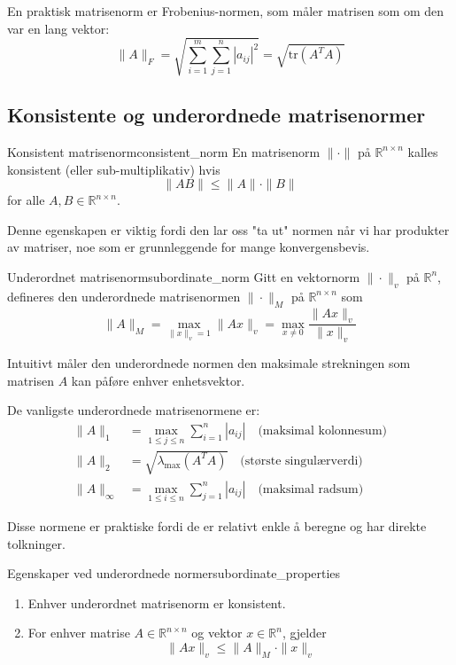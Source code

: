 En praktisk matrisenorm er Frobenius-normen, som måler matrisen som om den var en lang vektor:
\[
	\|A\|_F = \sqrt{\sum_{i=1}^m \sum_{j=1}^n |a_{ij}|^2} = \sqrt{\text{tr}(A^T A)}
\]

\subsection{Konsistente og underordnede matrisenormer}

\begin{definition}{Konsistent matrisenorm}{consistent_norm}
	En matrisenorm $\|\cdot\|$ på $\mathbb{R}^{n \times n}$ kalles konsistent (eller sub-multiplikativ) hvis
	\[
		\|AB\| \leq \|A\| \cdot \|B\|
	\]
	for alle $A, B \in \mathbb{R}^{n \times n}$.
\end{definition}

Denne egenskapen er viktig fordi den lar oss "ta ut" normen når vi har produkter av matriser, noe som er grunnleggende for mange konvergensbevis.

\begin{definition}{Underordnet matrisenorm}{subordinate_norm}
	Gitt en vektornorm $\|\cdot\|_v$ på $\mathbb{R}^n$, defineres den underordnede matrisenormen $\|\cdot\|_M$ på $\mathbb{R}^{n \times n}$ som
	\[
		\|A\|_M = \max_{\|x\|_v = 1} \|Ax\|_v = \max_{x \neq 0} \frac{\|Ax\|_v}{\|x\|_v}
	\]
\end{definition}

Intuitivt måler den underordnede normen den maksimale strekningen som matrisen $A$ kan påføre enhver enhetsvektor.

De vanligste underordnede matrisenormene er:
\begin{align*}
	\|A\|_1      & = \max_{1 \leq j \leq n} \sum_{i=1}^n |a_{ij}| \quad \text{(maksimal kolonnesum)} \\
	\|A\|_2      & = \sqrt{\lambda_{\max}(A^T A)} \quad \text{(største singulærverdi)}               \\
	\|A\|_\infty & = \max_{1 \leq i \leq n} \sum_{j=1}^n |a_{ij}| \quad \text{(maksimal radsum)}
\end{align*}

Disse normene er praktiske fordi de er relativt enkle å beregne og har direkte tolkninger.

\begin{theorem}{Egenskaper ved underordnede normer}{subordinate_properties}
	\begin{enumerate}
		\item Enhver underordnet matrisenorm er konsistent.
		\item For enhver matrise $A \in \mathbb{R}^{n \times n}$ og vektor $x \in \mathbb{R}^n$, gjelder
		      \[
			      \|Ax\|_v \leq \|A\|_M \cdot \|x\|_v
		      \]
	\end{enumerate}
\end{theorem}

